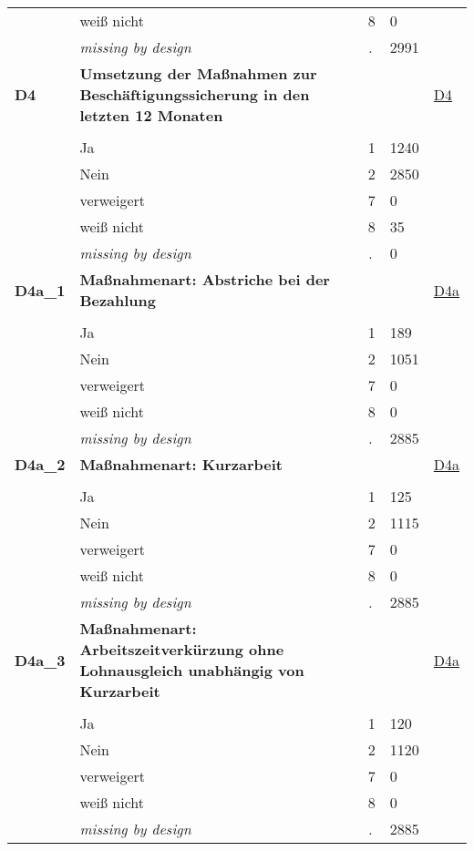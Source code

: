 \begin{longtable}{| L{2.65cm} | L{8cm} | C{1.5cm} | R{1.25cm} | C{2.25cm}  |}
   & weiß nicht & 8 & 0 &  \\ 
   & \textit{missing by design} & \textit{.} & 2991 &  \\ 
   \midrule
\textbf{D4}\label{var:D4} & \textbf{Umsetzung der Maßnahmen zur Beschäftigungssicherung in den letzten 12 Monaten} &  &  & \hyperref[D4]{D4} \\ 
   &  &  &  &  \\ 
   & Ja & 1 & 1240 &  \\ 
   & Nein & 2 & 2850 &  \\ 
   & verweigert & 7 & 0 &  \\ 
   & weiß nicht & 8 & 35 &  \\ 
   & \textit{missing by design} & \textit{.} & 0 &  \\ 
   \midrule
\textbf{D4a\_1}\label{var:D4a:1} & \textbf{Maßnahmenart: Abstriche bei der Bezahlung} &  &  & \hyperref[D4a]{D4a} \\ 
   &  &  &  &  \\ 
   & Ja & 1 & 189 &  \\ 
   & Nein & 2 & 1051 &  \\ 
   & verweigert & 7 & 0 &  \\ 
   & weiß nicht & 8 & 0 &  \\ 
   & \textit{missing by design} & \textit{.} & 2885 &  \\ 
   \midrule
\textbf{D4a\_2}\label{var:D4a:2} & \textbf{Maßnahmenart: Kurzarbeit} &  &  & \hyperref[D4a]{D4a} \\ 
   &  &  &  &  \\ 
   & Ja & 1 & 125 &  \\ 
   & Nein & 2 & 1115 &  \\ 
   & verweigert & 7 & 0 &  \\ 
   & weiß nicht & 8 & 0 &  \\ 
   & \textit{missing by design} & \textit{.} & 2885 &  \\ 
   \midrule
\textbf{D4a\_3}\label{var:D4a:3} & \textbf{Maßnahmenart: Arbeitszeitverkürzung ohne Lohnausgleich unabhängig von Kurzarbeit} &  &  & \hyperref[D4a]{D4a} \\ 
   &  &  &  &  \\ 
   & Ja & 1 & 120 &  \\ 
   & Nein & 2 & 1120 &  \\ 
   & verweigert & 7 & 0 &  \\ 
   & weiß nicht & 8 & 0 &  \\ 
   & \textit{missing by design} & \textit{.} & 2885 &  \\ 

\end{longtable}
